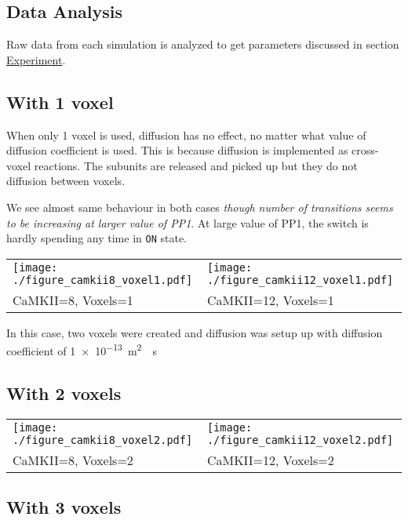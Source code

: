 \documentclass[]{article}
\begin{document}
\subsection{Data Analysis}\label{data-analysis}

Raw data from each simulation is analyzed to get parameters discussed in
section \protect\hyperlink{sec:experiment}{Experiment}.

\subsection{With 1 voxel}\label{sec:va}

When only 1 voxel is used, diffusion has no effect, no matter what value
of diffusion coefficient is used. This is because diffusion is
implemented as cross-voxel reactions. The subunits are released and
picked up but they do not diffusion between voxels.

We see almost same behaviour in both cases \emph{though number of
transitions seems to be increasing at larger value of PP1}. At large
value of PP1, the switch is hardly spending any time in \texttt{ON}
state.


\begin{longtable}[]{@{}ll@{}}
\toprule
\texttt{[image: ./figure\_camkii8\_voxel1.pdf]} &
\texttt{[image: ./figure\_camkii12\_voxel1.pdf]}\tabularnewline
CaMKII=8, Voxels=1 & CaMKII=12, Voxels=1\tabularnewline
\bottomrule
\end{longtable}

In this case, two voxels were created and diffusion was setup up with
diffusion coefficient of \SI{1e-13}{\meter ^2 \per \second}

\subsection{With 2 voxels}\label{sec:vb}

\begin{longtable}[]{@{}ll@{}}
\toprule
\texttt{[image: ./figure\_camkii8\_voxel2.pdf]} &
\texttt{[image: ./figure\_camkii12\_voxel2.pdf]}\tabularnewline
CaMKII=8, Voxels=2 & CaMKII=12, Voxels=2\tabularnewline
\bottomrule
\end{longtable}

\subsection{With 3 voxels}\label{sec:vc}
\end{document}
